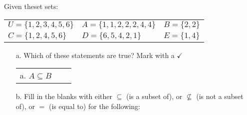 \documentclass[a4paper,12pt]{book}
\newcounter{question}
\begin{document}
        \newpage
        \begin{questionNOGRADE}{\thequestion}

            Given theset sets:

            \begin{tabular}{l l l}
                $U = \{1, 2, 3, 4, 5, 6\}$ &
                $A = \{1, 1, 2, 2, 2, 4, 4\}$ &
                $B = \{2, 2\}$ \\
                $C = \{1, 2, 4, 5, 6\}$ &
                $D = \{6, 5, 4, 2, 1\}$ &
                $E = \{1, 4\}$
            \end{tabular}

            \begin{enumerate}
                \item[a.] Which of these statements are true? Mark with a $\checkmark$

                \begin{tabular}{l l l}
                    a. $A \subseteq B$      \solution{}{}
                \end{tabular}

                \item[b.] Fill in the blanks with either
                    $\subseteq$ (is a subset of), or
                    $\not\subseteq$ (is not a subset of), or
                    $=$ (is equal to) for the following:
            \end{enumerate}

        \end{questionNOGRADE}


        \begin{questionNOGRADE}{\thequestion}


        \end{questionNOGRADE}


        \begin{questionNOGRADE}{\thequestion}


        \end{questionNOGRADE}
\end{document}
